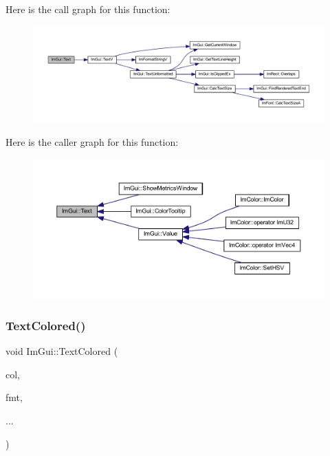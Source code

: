 Here is the call graph for this function\+:
\nopagebreak
\begin{figure}[H]
\begin{center}
\leavevmode
\includegraphics[width=350pt]{namespace_im_gui_a9e7b83611fe441d54fad2effb4bf4965_cgraph}
\end{center}
\end{figure}
Here is the caller graph for this function\+:
\nopagebreak
\begin{figure}[H]
\begin{center}
\leavevmode
\includegraphics[width=350pt]{namespace_im_gui_a9e7b83611fe441d54fad2effb4bf4965_icgraph}
\end{center}
\end{figure}
\mbox{\label{namespace_im_gui_a36ab8fcad68b26863d6e910755de04c2}} 
\subsubsection{\texorpdfstring{Text\+Colored()}{TextColored()}}
{\footnotesize\ttfamily void Im\+Gui\+::\+Text\+Colored (\begin{DoxyParamCaption}\item[{const \mbox{\hyperlink{struct_im_vec4}{Im\+Vec4}} \&}]{col,  }\item[{const char $\ast$}]{fmt,  }\item[{}]{... }\end{DoxyParamCaption})}

